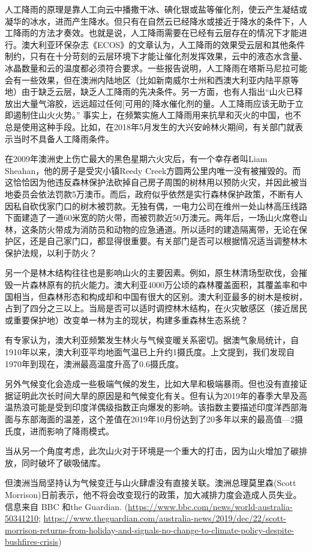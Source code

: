 \documentclass[
]{book}
\begin{document}
人工降雨的原理是靠人工向云中播撒干冰、碘化银或盐等催化剂，使云产生凝结或凝华的冰水，进而产生降水。但只有在自然云已经降水或接近于降水的条件下，人工降雨的方法才奏效。也就是说，人工降雨需要在已经有云层存在的情况下才能进行。澳大利亚环保杂志《ECOS》的文章认为，人工降雨的效果受云层和其他条件制约，只有在十分苛刻的云层环境下才能让催化剂发挥效果，云中的液态水含量、冰晶数量和云的温度都必须符合要求。一些报告说明，人工降雨在塔斯马尼拉可能会有一些效果，但在澳洲内陆地区（比如新南威尔士州和西澳大利亚内陆平原等地）由于缺乏云层，缺乏人工降雨的先决条件。另一方面，也有人指出``山火已释放出大量气溶胶，远远超过任何{[}可用的{]}降水催化剂的量。人工降雨应该无助于立即遏制住山火火势。'' 事实上，在频繁实施人工降雨用来抗旱和灭火的中国，也不总是使用这种手段。比如，在2018年5月发生的大兴安岭林火期间，有关部门就表示当时不具备人工降雨条件。

在2009年澳洲史上伤亡最大的黑色星期六火灾后，有一个幸存者叫Liam Sheahan，他的房子是受灾小镇Reedy Creek方圆两公里内唯一没有被摧毁的。而这恰恰因为他违反森林保护法砍掉自己房子周围的树林用以预防火灾，并因此被当地委员会依法罚款5万澳币。而后，政府似乎依然是实行森林保护政策，不断有人因私自砍伐家门口的树木被罚款。无独有偶，一电力公司在维州一处山林高压线路下面建造了一道60米宽的防火带，而被罚款近50万澳元。两年后，一场山火席卷山林，这条防火带成为消防员和动物的应急通道。所以适时的建造隔离带，无论在保护区，还是自己家门口，都显得很重要。有关部门是否可以根据情况适当调整林木保护法规，以利于防火？

另一个是林木结构往往也是影响山火的主要因素。例如，原生林清场型砍伐，会摧毁一片森林原有的抗火能力。澳大利亚4000万公顷的森林覆盖面积，其覆盖率和中国相当，但森林形态和构成却和中国有很大的区别。澳大利亚最多的树木是桉树，占到了四分之三以上。当局是否可以适时调控林木结构，在火灾敏感区（接近居民或重要保护地）改变单一林为主的现状，构建多重森林生态系统？

有专家认为，澳大利亚频繁发生林火与气候变暖关系密切。据澳气象局统计，自1910年以来，澳大利亚平均地面气温已上升约1摄氏度。上文提到，我们发现自1970年到现在，澳洲最高温度升高了0.6摄氏度。

另外气候变化会造成一些极端气候的发生，比如大旱和极端暴雨。但也没有直接证据证明此次长时间大旱的原因是和气候变化有关。但有认为2019年的春季大旱及高温热浪可能是受到印度洋偶级指数正向爆发的影响。该指数主要描述印度洋西部海面与东部海面的温差，这个差值在2019年10月份达到了20多年以来的最高值---2摄氏度，进而影响了降雨模式。

当从另一个角度考虑，此次山火对于环境是一个重大的打击，因为山火增加了碳排放，同时破坏了碳吸储库。

但澳洲当局坚持认为气候变迁与山火肆虐没有直接关联。澳洲总理莫里森(Scott Morrison)日前表示，他不将会改变现行的政策，加大减排力度会造成人员失业。信息来自 BBC 和the Guardian. (\url{https://www.bbc.com/news/world-australia-50341210}; \url{https://www.theguardian.com/australia-news/2019/dec/22/scott-morrison-returns-from-holiday-and-signals-no-change-to-climate-policy-despite-bushfires-crisis})
\end{document}
